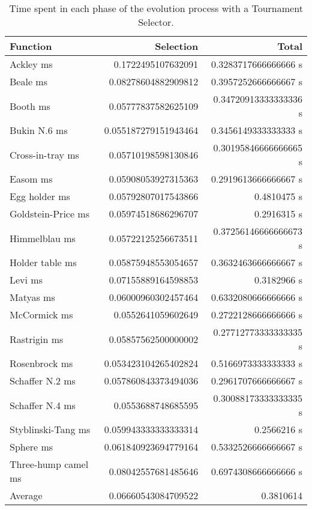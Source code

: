     \begin{table}[H]
      \centering
      \begin{tabular}{|l|r|r|}
        \hline
        Function  & Selection & Total \\
        \hline\hline
        Ackley ms	& 0.1722495107632091	& 0.3283717666666666 s\\\hline
        Beale ms	& 0.08278604882909812	& 0.3957252666666667 s\\\hline
        Booth ms	& 0.05777837582625109	& 0.34720913333333336 s\\\hline
        Bukin N.6 ms	& 0.055187279151943464	& 0.3456149333333333 s\\\hline
        Cross-in-tray ms	& 0.05710198598130846	& 0.30195846666666665 s\\\hline
        Easom ms	& 0.05908053927315363	& 0.2919613666666667 s\\\hline
        Egg holder ms	& 0.05792807017543866	& 0.4810475 s\\\hline
        Goldstein-Price ms	& 0.05974518686296707	& 0.2916315 s\\\hline
        Himmelblau ms	& 0.05722125256673511	& 0.37256146666666673 s\\\hline
        Holder table ms	& 0.05875948553054657	& 0.3632463666666667 s\\\hline
        Levi ms	& 0.07155889164598853	& 0.3182966 s\\\hline
        Matyas ms	& 0.06000960302457464	& 0.6332080666666666 s\\\hline
        McCormick ms	& 0.0552641059602649	& 0.2722128666666666 s\\\hline
        Rastrigin ms	& 0.05857562500000002	& 0.27712773333333335 s\\\hline
        Rosenbrock ms	& 0.053423104265402824	& 0.5166973333333333 s\\\hline
        Schaffer N.2 ms	& 0.057860843373494036	& 0.2961707666666667 s\\\hline
        Schaffer N.4 ms	& 0.0553688748685595	& 0.30088173333333335 s\\\hline
        Styblinski-Tang ms	& 0.059943333333333314	& 0.2566216 s\\\hline
        Sphere ms	& 0.061840923694779164	& 0.5332526666666667 s\\\hline
        Three-hump camel ms	& 0.08042557681485646	& 0.6974308666666666 s\\\hline
       \hline Average	& 0.06660543084709522	& 0.3810614 \\\hline
      \end{tabular}
      \caption{
        Time spent in each phase of the evolution process with a Tournament Selector.
      }
      \label{tab:fn_opt:results:time}
    \end{table}

